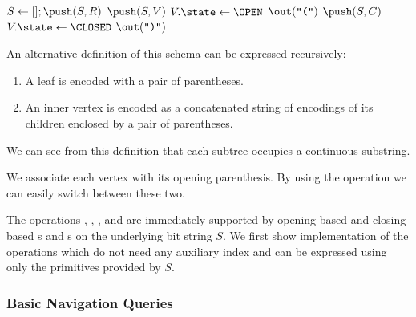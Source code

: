 \begin{algorithmic}
	\State $S \gets []; \push(S, R)$ 
		 
			\State $\push(S, V)$ 
			\State $V.\state \gets \OPEN$
			\State $\out(\openingParen)$
				\State $\push(S, C)$
			\EndFor
		 
			\State $V.\state \gets \CLOSED$
			\State $\out(\closingParen)$
		\EndIf
	\EndWhile
\EndFunction
\end{algorithmic}

An alternative definition of this schema can be expressed recursively:
\begin{enumerate}
	\item A leaf is encoded with a pair of parentheses.
	\item An inner vertex is encoded as a concatenated string of encodings of its children enclosed by a pair of parentheses.
\end{enumerate}
We can see from this definition that each subtree occupies a continuous substring.

\bigbreak

We associate each vertex with its opening parenthesis.
By using the operation \match we can easily switch between these two.

The operations \preRank, \preSelect, \postRank, and \postSelect are immediately supported by opening-based and closing-based \rank{}s and \select{}s on the underlying bit string $S$.
We first show implementation of the operations which do not need any auxiliary index and can be expressed using only the primitives provided by $S$.

\begin{algorithmic}
	\State {}
\EndFunction
\end{algorithmic}

\begin{algorithmic}
	\State {} 
\EndFunction
\end{algorithmic}

\subsubsection{Basic Navigation Queries}

